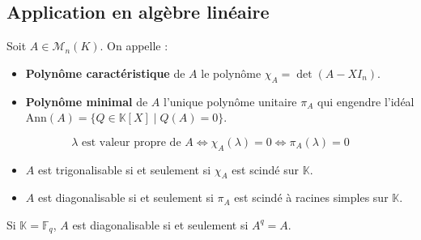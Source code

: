   \subsection{Application en algèbre linéaire}


  \begin{definition}
    Soit $A \in \mathcal{M}_n(K)$. On appelle :
    \begin{itemize}
      \item \textbf{Polynôme caractéristique} de $A$ le polynôme $\chi_A = \det(A - XI_n)$.
      \item \textbf{Polynôme minimal} de $A$ l'unique polynôme unitaire $\pi_A$ qui engendre l'idéal $\mathrm{Ann}(A) = \{ Q \in \mathbb{K}[X] \mid Q(A) = 0 \}$.
    \end{itemize}
  \end{definition}


  \begin{proposition}
    \[ \lambda \text{ est valeur propre de } A \iff \chi_A(\lambda) = 0 \iff \pi_A(\lambda) = 0 \]
  \end{proposition}


  \begin{proposition}
    \begin{itemize}
      \item $A$ est trigonalisable si et seulement si $\chi_A$ est scindé sur $\mathbb{K}$.
      \item $A$ est diagonalisable si et seulement si $\pi_A$ est scindé à racines simples sur $\mathbb{K}$.
    \end{itemize}
  \end{proposition}

  \begin{corollary}
    Si $\mathbb{K} = \mathbb{F}_q$, $A$ est diagonalisable si et seulement si $A^q = A$.
  \end{corollary}

